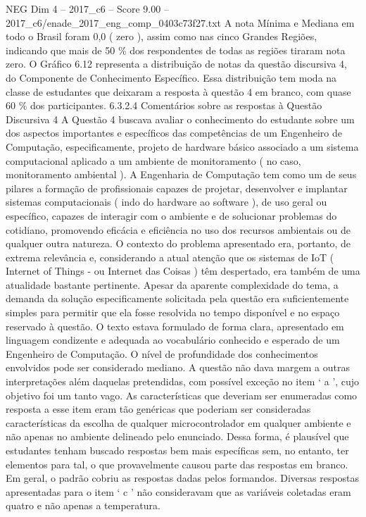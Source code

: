 \begin{textsample}{NEG Dim 4 – 2017\_c6 – Score 9.00 – 2017\_c6/enade\_2017\_eng\_comp\_0403c73f27.txt}
A nota Mínima e Mediana em todo o Brasil foram 0,0 ( zero ), assim como nas cinco Grandes Regiões, indicando que mais de 50 \% dos respondentes de todas as regiões tiraram nota zero.
O Gráfico 6.12 representa a distribuição de notas da questão discursiva 4, do Componente de Conhecimento Específico.
Essa distribuição tem moda na classe de estudantes que deixaram a resposta à questão 4 em branco, com quase 60 \% dos participantes. 6.3.2.4 Comentários sobre as respostas à Questão Discursiva 4 A Questão 4 buscava avaliar o conhecimento do estudante sobre um dos aspectos importantes e específicos das competências de um Engenheiro de Computação, especificamente, projeto de hardware básico associado a um sistema computacional aplicado a um ambiente de monitoramento ( no caso, monitoramento ambiental ).
A Engenharia de Computação tem como um de seus pilares a formação de profissionais capazes de projetar, desenvolver e implantar sistemas computacionais ( indo do hardware ao software ), de uso geral ou específico, capazes de interagir com o ambiente e de solucionar problemas do cotidiano, promovendo eficácia e eficiência no uso dos recursos ambientais ou de qualquer outra natureza.
O contexto do problema apresentado era, portanto, de extrema relevância e, considerando a atual atenção que os sistemas de IoT ( Internet of Things - ou Internet das Coisas ) têm despertado, era também de uma atualidade bastante pertinente.
Apesar da aparente complexidade do tema, a demanda da solução especificamente solicitada pela questão era suficientemente simples para permitir que ela fosse resolvida no tempo disponível e no espaço reservado à questão.
O texto estava formulado de forma clara, apresentado em linguagem condizente e adequada ao vocabulário conhecido e esperado de um Engenheiro de Computação.
O nível de profundidade dos conhecimentos envolvidos pode ser considerado mediano.
A questão não dava margem a outras interpretações além daquelas pretendidas, com possível exceção no item ‘ a ’, cujo objetivo foi um tanto vago.
As características que deveriam ser enumeradas como resposta a esse item eram tão genéricas que poderiam ser consideradas características da escolha de qualquer microcontrolador em qualquer ambiente e não apenas no ambiente delineado pelo enunciado.
Dessa forma, é plausível que estudantes tenham buscado respostas bem mais específicas sem, no entanto, ter elementos para tal, o que provavelmente causou parte das respostas em branco.
Em geral, o padrão cobriu as respostas dadas pelos formandos.
Diversas respostas apresentadas para o item ‘ c ’ não consideravam que as variáveis coletadas eram quatro e não apenas a temperatura.

\end{textsample}
